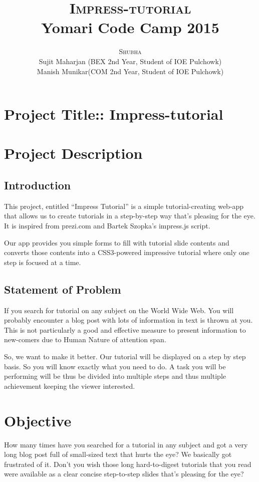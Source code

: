 \documentclass[12pt,a4paper,titlepage]{article}
\title{
  {\Huge{\textsc{Impress-tutorial}}}\\
  {\Large{Yomari Code Camp 2015}}
}
\author{
  {\textsc{Shubha}} \\ 
  {\small{Sujit Maharjan (BEX 2nd Year, Student of IOE Pulchowk)}} \\ 
  {\small{Manish Munikar(COM 2nd Year, Student of IOE Pulchowk)}}
}
\begin{document}
\maketitle

\section{Project Title:: Impress-tutorial}

\section{Project Description}

\subsection{Introduction}
This project, entitled “Impress Tutorial” is a simple tutorial-creating web-app that allows us to create tutorials in a step-by-step way that's pleasing for the eye. It is inspired from prezi.com and Bartek Szopka's impress.js script.

Our app provides you simple forms to fill with tutorial slide contents and converts those contents into a CSS3-powered impressive tutorial where only one step is focused at a time.

\subsection{Statement of Problem}
If you search for tutorial on any subject on the World Wide Web. You will probably encounter a blog post with lots of information in text is thrown at you. This is not particularly a good and effective measure to present information to new-comers due to Human Nature of attention span.

So, we want to make it better. Our tutorial will be displayed on a step by step basis. So you will know exactly what you need to do. A task you will be performing will be thus be divided into multiple steps and thus multiple achievement keeping the viewer interested. 

\section{Objective}

How many times have you searched for a tutorial in any subject and got a very long blog post full of small-sized text that hurts the eye? We basically got frustrated of it. Don't you wish those long hard-to-digest tutorials that you read were available as a clear concise step-to-step slides that's pleasing for the eye?
\end{document}
